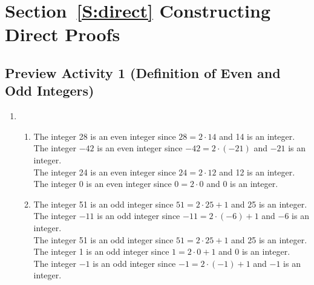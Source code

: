 \section*{Section~\ref{S:direct} Constructing Direct Proofs}

\subsection*{Preview Activity 1 (Definition of Even and Odd Integers)}
\begin{enumerate}
\item \begin{enumerate}
\item The integer 28 is an even integer since $28 = 2 \cdot 14$ and 14 is an integer. \\
The integer $-42$ is an even integer since $-42 = 2 \cdot (-21)$ and $-21$ is an integer. \\
The integer 24 is an even integer since $24 = 2 \cdot 12$ and 12 is an integer. \\
The integer 0 is an even integer since $0 = 2 \cdot 0$ and 0 is an integer. \\

\item The integer 51 is an odd integer since $51 = 2 \cdot 25 + 1$ and 25 is an integer. \\
The integer $-11$ is an odd integer since $-11 = 2 \cdot (-6) + 1$ and $-6$ is an integer. \\
The integer 51 is an odd integer since $51 = 2 \cdot 25 + 1$ and 25 is an integer. \\
The integer 1 is an odd integer since $1 = 2 \cdot 0 + 1$ and 0 is an integer. \\
The integer $-1$ is an odd integer since $-1 = 2 \cdot (-1) + 1$ and $-1$ is an integer. \\
\end{enumerate}
\end{enumerate}

%
%
\hbreak



